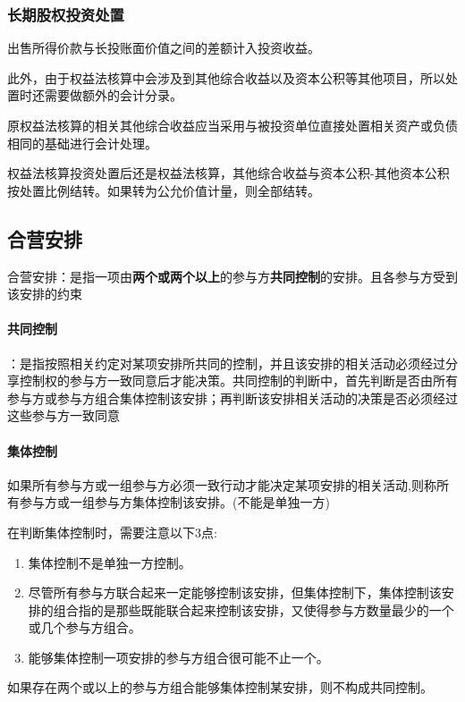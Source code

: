 \documentclass[UTF8,12pt]{ctexart}
\numberwithin{equation}{section} %
\numberwithin{figure}{section}
\numberwithin{table}{section}
\begin{document}
	\subsubsection{长期股权投资处置}
	出售所得价款与长投账面价值之间的差额计入投资收益。
	
	此外，由于权益法核算中会涉及到其他综合收益以及资本公积等其他项目，所以处置时还需要做额外的会计分录。
	
	原权益法核算的相关其他综合收益应当采用与被投资单位直接处置相关资产或负债相同的基础进行会计处理。
	
	权益法核算投资处置后还是权益法核算，其他综合收益与资本公积-其他资本公积按处置比例结转。如果转为公允价值计量，则全部结转。
	
	
	
	\subsection{合营安排}
	合营安排：是指一项由\textbf{两个或两个以上}的参与方\textbf{共同控制}的安排。且各参与方受到该安排的约束
	
	
	\paragraph{共同控制}：是指按照相关约定对某项安排所共同的控制，并且该安排的相关活动必须经过分享控制权的参与方一致同意后才能决策。共同控制的判断中，首先判断是否由所有参与方或参与方组合集体控制该安排；再判断该安排相关活动的决策是否必须经过这些参与方一致同意
	
	\paragraph{集体控制}
	如果所有参与方或一组参与方必须一致行动才能决定某项安排的相关活动,则称所有参与方或一组参与方集体控制该安排。(不能是单独一方)
	
	在判断集体控制时，需要注意以下3点:
	\begin{enumerate}
		\item 集体控制不是单独一方控制。
		
		\item 尽管所有参与方联合起来一定能够控制该安排，但集体控制下，集体控制该安排的组合指的是那些既能联合起来控制该安排，又使得参与方数量最少的一个或几个参与方组合。
		
		\item 能够集体控制一项安排的参与方组合很可能不止一个。
	\end{enumerate}
	
	如果存在两个或以上的参与方组合能够集体控制某安排，则不构成共同控制。
	
\end{document}
